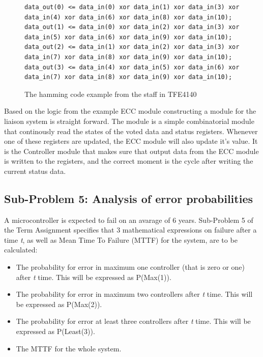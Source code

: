 \documentclass[a4paper]{IEEEtran}
\begin{document}
\begin{figure}[h!]
\begin{lstlisting}
data_out(0) <= data_in(0) xor data_in(1) xor data_in(3) xor data_in(4) xor data_in(6) xor data_in(8) xor data_in(10);
data_out(1) <= data_in(0) xor data_in(2) xor data_in(3) xor data_in(5) xor data_in(6) xor data_in(9) xor data_in(10);
data_out(2) <= data_in(1) xor data_in(2) xor data_in(3) xor data_in(7) xor data_in(8) xor data_in(9) xor data_in(10);
data_out(3) <= data_in(4) xor data_in(5) xor data_in(6) xor data_in(7) xor data_in(8) xor data_in(9) xor data_in(10);
\end{lstlisting}
\caption{The hamming code example from the staff in TFE4140 \protect\cite{assignment-text}}
\label{fig:HammingCodeLogic}
\end{figure}

Based on the logic from the example ECC module\protect\cite{hamming-codes} constructing a module for the liaison system is straight forward.
The module is a simple combinatorial module that continously read the states of the voted data and status registers.
Whenever one of these registers are updated, the ECC module will also update it's value.
It is the Controller module that makes sure that output data from the ECC module is written to the registers, and the correct moment is the cycle after writing the current status data.

\subsection{Sub-Problem 5: Analysis of error probabilities}
A microcontroller is expected to fail on an avarage of 6 years.
Sub-Problem 5 of the Term Assignment\protect\cite{assignment-text} specifies that 3 mathematical expressions on failure after a time \textit{t}, as well as Mean Time To Failure (MTTF) for the system, are to be calculated:

\begin{itemize}
    \item The probability for error in maximum one controller (that is zero or one) after \textit{t} time. This will be expressed as P(Max(1)). 
    \item The probability for error in maximum two controllers after \textit{t} time. This will be expressed as P(Max(2)).
    \item The probability for error at least three controllers after \textit{t} time. This will be expressed as P(Least(3)).
    \item The MTTF for the whole system.
\end{itemize}
\end{document}
